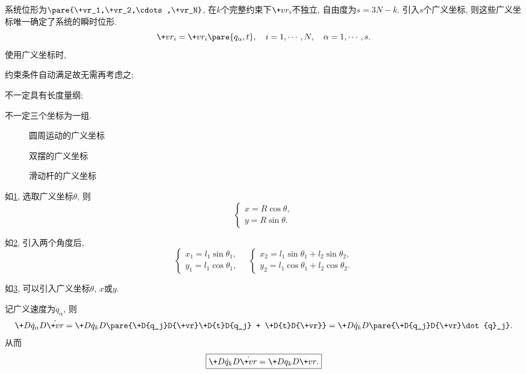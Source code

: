 \documentclass{ctexart}
\begin{document}
系统位形为$\pare{\+vr_1,\+vr_2,\cdots,\+vr_N}$, 在$k$个完整约束下$\+vr_i$不独立, 自由度为$s=3N - k$. 引入$s$个广义坐标, 则这些广义坐标唯一确定了系统的瞬时位形.
\[ \+vr_i = \+vr_i\pare{q_\alpha, t},\quad i=1,\cdots, N,\quad  \alpha=1,\cdots, s. \]
使用广义坐标时,
\begin{cenum}
    \item 约束条件自动满足故无需再考虑之;
    \item 不一定具有长度量纲;
    \item 不一定三个坐标为一组.
\end{cenum}
\begin{figure}[ht]
    \centering
    \caption{圆周运动的广义坐标}
    \label{fig:圆周运动的广义坐标}
\end{figure}
\begin{figure}[ht]
    \centering
    \caption{双摆的广义坐标}
    \label{fig:双摆的广义坐标}
\end{figure}
\begin{figure}[htbp]
    \centering
    \caption{滑动杆的广义坐标}
    \label{fig:滑动杆的广义坐标}
\end{figure}
\begin{sample}
    \begin{ex}
        如\cref{fig:圆周运动的广义坐标}, 选取广义坐标$\theta$, 则
        \[ \begin{cases}
            x = R\cos\theta,\\
            y = R\sin\theta.
        \end{cases} \]
    \end{ex}
\end{sample}
\begin{sample}
    \begin{ex}
        如\cref{fig:双摆的广义坐标}, 引入两个角度后,
        \[ \begin{cases}
            x_1 = l_1\sin\theta_1,\\
            y_1 = l_1\cos\theta_1,
        \end{cases}\quad \begin{cases}
            x_2 = l_1\sin\theta_1 + l_2\sin\theta_2,\\
            y_2 = l_1\cos\theta_1 + l_2\cos\theta_2.
        \end{cases} \]
    \end{ex}
\end{sample}
\begin{sample}
    \begin{ex}
        如\cref{fig:滑动杆的广义坐标}, 可以引入广义坐标$\theta$, $x$或$y$.
    \end{ex}
\end{sample}
记广义速度为$\dot{q}_\alpha$, 则
\[ \+D{\dot{q}_\alpha}D{\dot{\+vr}} = \+D{\dot{q}_k}D{}\pare{\+D{q_j}D{\+vr}\+D{t}D{q_j} + \+D{t}D{\+vr}} = \+D{\dot{q}_k}D{}\pare{\+D{q_j}D{\+vr}\dot{q}_j}. \]
从而
\[ \boxed{\+D{\dot{q}_k}D{\dot{\+vr}} = \+D{q_k}D{\+vr}.} \]
\end{document}
